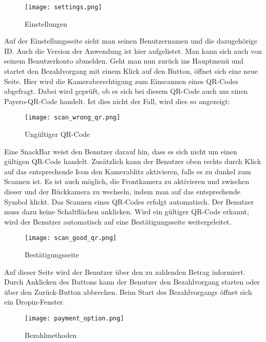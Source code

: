 \begin{figure}[H]
  \centering
  \texttt{[image: settings.png]}
  \caption{Einstellungen}
\end{figure}

Auf der Einstellungsseite sieht man seinen Benutzernamen und die dazugehörige ID.
Auch die Version der Anwendung ist hier aufgelistet.
Man kann sich auch von seinem Benutzerkonto abmelden.
Geht man nun zurück ins Hauptmenü und startet den Bezahlvorgang mit einem Klick auf den Button, öffnet sich eine neue Seite.
Hier wird die Kameraberechtigung zum Einscannen eines QR-Codes abgefragt.
Dabei wird geprüft, ob es sich bei diesem QR-Code auch um einen Payero-QR-Code handelt.
Ist dies nicht der Fall, wird dies so angezeigt:

\begin{figure}[H]
  \centering
  \texttt{[image: scan\_wrong\_qr.png]}
  \caption{Ungültiger QR-Code}
\end{figure}

Eine SnackBar weist den Benutzer darauf hin, dass es sich nicht um einen gültigen QR-Code handelt.
Zusätzlich kann der Benutzer oben rechts durch Klick auf das entsprechende Icon den Kamerablitz aktivieren, falls es zu dunkel zum Scannen ist.
Es ist auch möglich, die Frontkamera zu aktivieren und zwischen dieser und der Rückkamera zu wechseln, indem man auf das entsprechende Symbol klickt.
Das Scannen eines QR-Codes erfolgt automatisch.
Der Benutzer muss dazu keine Schaltflächen anklicken.
Wird ein gültiger QR-Code erkannt, wird der Benutzer automatisch auf eine Bestätigungsseite weitergeleitet.

\begin{figure}[H]
  \centering
  \texttt{[image: scan\_good\_qr.png]}
  \caption{Bestätigungsseite}
\end{figure}

Auf dieser Seite wird der Benutzer über den zu zahlenden Betrag informiert.
Durch Anklicken des Buttons kann der Benutzer den Bezahlvorgang starten oder über den Zurück-Button abbrechen.
Beim Start des Bezahlvorgangs öffnet sich ein Dropin-Fenster.

\begin{figure}[H]
  \centering
  \texttt{[image: payment\_option.png]}
  \caption{Bezahlmethoden}
\end{figure}

